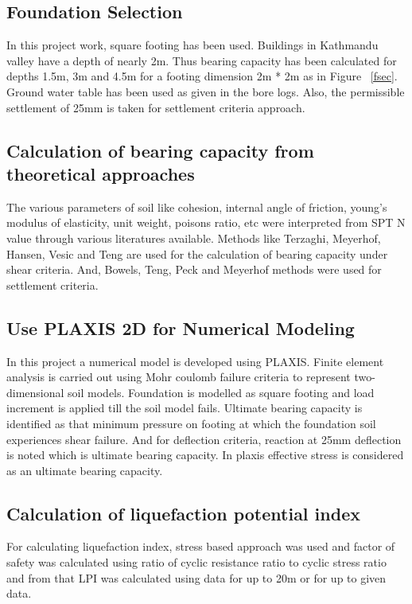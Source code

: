 \subsection{Foundation Selection}
In this project work, square footing has been used. Buildings in Kathmandu valley have a depth of nearly 2m. Thus bearing capacity has been calculated for depths 1.5m, 3m and 4.5m for a footing dimension 2m * 2m as in Figure ~\ref{fsec}. Ground water table has been used as given in the bore logs. Also, the permissible settlement of 25mm is taken for settlement criteria approach.

\subsection{Calculation of bearing capacity from theoretical approaches}
The various parameters of soil like cohesion, internal angle of friction, young’s modulus of elasticity, unit weight, poisons ratio, etc were interpreted from SPT N value through various literatures available. Methods like Terzaghi, Meyerhof, Hansen, Vesic and Teng are used for the calculation of bearing capacity under shear criteria. And, Bowels, Teng, Peck and Meyerhof methods were used for settlement criteria.

\subsection{Use PLAXIS 2D for Numerical Modeling}
In this project a numerical model is developed using PLAXIS. Finite element analysis is carried out using Mohr coulomb failure criteria to represent two-dimensional soil models. Foundation is modelled as square footing and load increment is applied till the soil model fails. Ultimate bearing capacity is identified as that minimum pressure on footing at which the foundation soil experiences shear failure. And for deflection criteria, reaction at 25mm deflection is noted which is ultimate bearing capacity. In plaxis effective stress is considered as an ultimate bearing capacity.

\subsection{Calculation of liquefaction potential index}
For calculating liquefaction index, stress based approach was used and factor of safety was calculated using ratio of cyclic resistance ratio to cyclic stress ratio and from that LPI was calculated using data for up to 20m or for up to given data.

